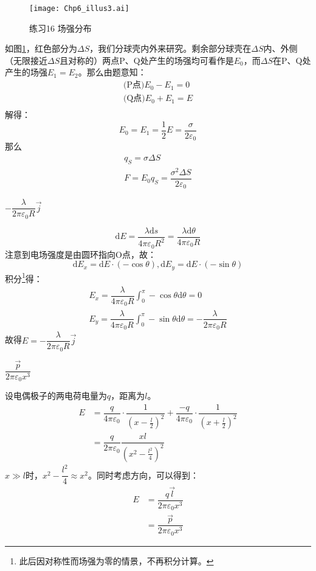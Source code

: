 \documentclass[b5paper,opensource,sourcefont,parskip]{qyxf-book}
\newcommand{\di}[1]{\mathrm{d}#1}
\begin{document}
\begin{figure}[!htbp]
	\centering
	\texttt{[image: Chp6\_illus3.ai]}
	\caption{练习16 场强分布}\label{fig:c6-t16}
\end{figure}
如图\ref{fig:c6-t16}，红色部分为$\Delta S$，我们分球壳内外来研究。剩余部分球壳在$\Delta S$内、外侧（无限接近$\Delta S$且对称的）两点P、Q处产生的场强均可看作是$E_0$，而$\Delta S$在P、Q处产生的场强$E_1=E_2$。那么由题意知：
\begin{gather*}
\text{(P点)}E_0-E_1=0\\
\text{(Q点)}E_0+E_1=E\\
\end{gather*}
解得：
\[
E_0=E_1=\dfrac{1}{2}E=\dfrac{\sigma}{2\varepsilon_0}
\]
那么
\begin{gather*}
q_S=\sigma\Delta S\\
F=E_0q_S=\dfrac{\sigma^2\Delta S}{2\varepsilon_0}
\end{gather*}

$-\dfrac{\lambda}{2\pi\varepsilon_0R}\vec{j}$

\solve
\[
\di{E}=\dfrac{\lambda \di{s}}{4\pi \varepsilon_0 R^2}=\dfrac{\lambda \di{\theta}}{4\pi \varepsilon_0 R}
\]
注意到电场强度是由圆环指向O点，故：
\[
\di{E_x}=\di{E}\cdot (-\cos\theta),\di{E_y}=\di{E}\cdot (-\sin\theta)
\]
积分\footnote{此后因对称性而场强为零的情景，不再积分计算。}得：
\begin{gather*}
E_x=\dfrac{\lambda}{4\pi \varepsilon_0 R}\int_0^{\pi} -\cos\theta\di{\theta}=0\\
E_y=\dfrac{\lambda}{4\pi \varepsilon_0 R}\int_0^{\pi} -\sin\theta\di{\theta}=-\dfrac{\lambda}{2\pi\varepsilon_0R}
\end{gather*}
故得$E=-\dfrac{\lambda}{2\pi\varepsilon_0R}\vec{j}$

$\dfrac{\vec{p}}{2\pi\varepsilon_0x^3}$

\solve
设电偶极子的两电荷电量为$q$，距离为$l$。
\begin{align*}
E&=\dfrac{q}{4\pi\varepsilon_0}\cdot \dfrac{1}{(x-\frac{l}{2})^2}+\dfrac{-q}{4\pi\varepsilon_0}\cdot \dfrac{1}{(x+\frac{l}{2})^2}\\
&=\dfrac{q}{2\pi\varepsilon_0}\dfrac{xl}{{(x^2-\frac{l^2}{4})}^2}
\end{align*}
$x\gg l$时，$x^2-\dfrac{l^2}{4}\approx x^2$。同时考虑方向，可以得到：
\begin{align*}
E&=\dfrac{q\vec{l}}{2\pi\varepsilon_0x^3}\\
&=\dfrac{\vec{p}}{2\pi\varepsilon_0x^3}
\end{align*}
\end{document}
